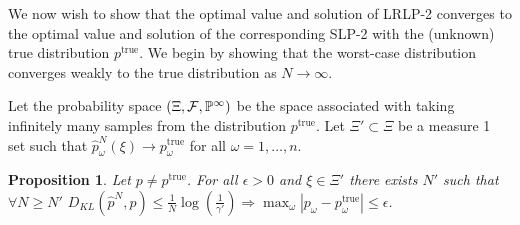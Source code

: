 \documentclass[11pt]{article}
\renewcommand{\P}{\mathbb{P}}
\newcommand{\ptrue}{p^{\text{true}}}
\newtheorem{proposition}[theorem]{Proposition}
\begin{document}
We now wish to show that the optimal value and solution of LRLP-2 converges to the optimal value and solution of the corresponding SLP-2 with the (unknown) true distribution $\ptrue$.
We begin by showing that the worst-case distribution converges weakly to the true distribution as $N \rightarrow \infty$.

Let the probability space $(\Xi,{\cal F},\P^\infty)$ be the space associated with taking infinitely many samples from the distribution $\ptrue$.
Let $\Xi' \subset \Xi$ be a measure 1 set such that $\hat{p}^N_\omega(\xi) \rightarrow \ptrue_\omega$ for all $\omega = 1, \dots, n$.

\begin{proposition} \label{prop:weak_conv}
	Let $p \neq \ptrue$.  For all $\epsilon > 0$ and $\xi \in \Xi'$ there exists $N'$ such that $\forall N \geq N'$ $D_{KL}(\hat{p}^N,p) \leq \frac{1}{N} \log\left(\frac{1}{\gamma'}\right) \Rightarrow \max_\omega |p_\omega - \ptrue_\omega| \leq \epsilon$.
\end{proposition}
\end{document}
